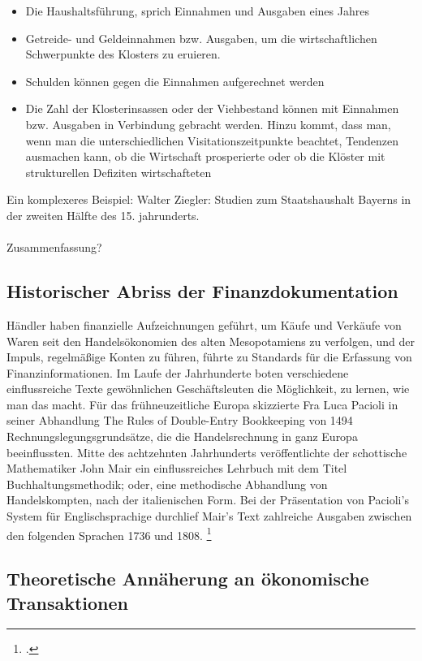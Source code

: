 \documentclass[12pt,a4paper]{article}
\begin{document}
\begin{itemize}
\item Die Haushaltsführung, sprich Einnahmen und Ausgaben eines Jahres 
\item Getreide- und Geldeinnahmen bzw. Ausgaben, um die wirtschaftlichen Schwerpunkte des Klosters zu eruieren.
\item Schulden können gegen die Einnahmen aufgerechnet werden 
\item Die Zahl der Klosterinsassen oder der Viehbestand können mit Einnahmen bzw. Ausgaben in Verbindung gebracht werden. Hinzu kommt, dass man, wenn man die unterschiedlichen Visitationszeitpunkte beachtet,
Tendenzen ausmachen kann, ob die Wirtschaft prosperierte oder ob die Klöster mit
strukturellen Defiziten wirtschafteten
\end{itemize} 
Ein komplexeres Beispiel: Walter Ziegler: Studien zum Staatshaushalt Bayerns in der zweiten Hälfte des 15. jahrunderts.
\\
\\
Zusammenfassung?
\subsection{Historischer Abriss der Finanzdokumentation}

Händler haben finanzielle Aufzeichnungen geführt, um Käufe und Verkäufe von Waren seit den Handelsökonomien des alten Mesopotamiens zu verfolgen, und der Impuls, regelmäßige Konten zu führen, führte zu Standards für die Erfassung von Finanzinformationen. Im Laufe der Jahrhunderte boten verschiedene einflussreiche Texte gewöhnlichen Geschäftsleuten die Möglichkeit, zu lernen, wie man das macht. Für das frühneuzeitliche Europa skizzierte Fra Luca Pacioli in seiner Abhandlung The Rules of Double-Entry Bookkeeping von 1494 Rechnungslegungsgrundsätze, die die Handelsrechnung in ganz Europa beeinflussten. Mitte des achtzehnten Jahrhunderts veröffentlichte der schottische Mathematiker John Mair ein einflussreiches Lehrbuch mit dem Titel 
Buchhaltungsmethodik; oder, eine methodische Abhandlung von Handelskompten, nach der italienischen Form. Bei der Präsentation von Pacioli's System für Englischsprachige durchlief Mair's Text zahlreiche Ausgaben zwischen den folgenden Sprachen 1736 und 1808. \footcite[][S.3]{tomasek2013encoding}


\subsection{Theoretische Annäherung an ökonomische Transaktionen}
\end{document}
